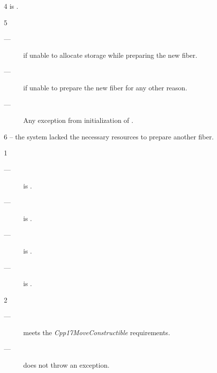 4 \postcond
\emptyfn is \false.

5 \except
\begin{description}
    \item[---]  if unable to allocate storage while preparing
               the new fiber.
    \item[---]  if unable to prepare the new fiber for any
               other reason.
    \item[---] Any exception from initialization of .
\end{description}

6 \errors
{} -- the system lacked the necessary resources to prepare another fiber.


1 \mandates
\begin{description}
    \item[---]  is \true.
    \item[---]  is \true.
    \item[---]  is \true.
    \item[---]  is \true.
\end{description}

2 \precond
\begin{description}
    \item[---]  meets the \emph{Cpp17MoveConstructible} requirements.
    \item[---]  does not throw an exception.
\end{description}

